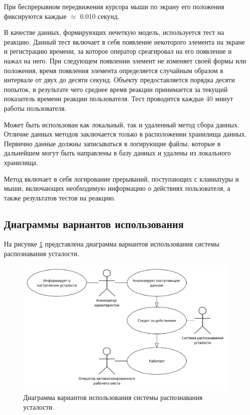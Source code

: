 При беспрерывном передвижения курсора мыши по экрану его положения фиксируются каждые $\approx$ 0.010 секунд.

В качестве данных, формирующих нечеткую модель, используется тест на реакцию. Данный тест включает в себя появление некоторого элемента на экране и регистрацию времени, за которое оператор среагировал на его появление и нажал на него. При следующем появлении элемент не изменяет своей формы или положения, время появления элемента определяется случайным образом в интервале от двух до десяти секунд. Объекту предоставляется порядка десяти попыток, в результате чего среднее время реакции принимается за текущий показатель времени реакции пользователя. Тест проводится каждые 40 минут работы пользователя.

Может быть использован как локальный, так и удаленный метод сбора данных. Отличие данных методов заключается только в расположении хранилища данных. Первично данные должны записываться в логирующие файлы, которые в дальнейшем могут быть направлены в базу данных и удалены из локального хранилища.

Метод включает в себя логирование прерываний, поступающих с клавиатуры и мыши, включающих необходимую информацию о действиях пользователя, а также результатов тестов на реакцию.

\subsection{Диаграммы вариантов использования}
На рисунке \ref{fig:useCase} представлена диаграмма вариантов использования системы распознавания усталости.
\begin{figure}[H]
	\centering
	\includegraphics[width=\textwidth]{img/useCaseDiagram.pdf}
	\caption{Диаграмма вариантов использования системы распознавания усталости.}
	\label{fig:useCase}
\end{figure}

